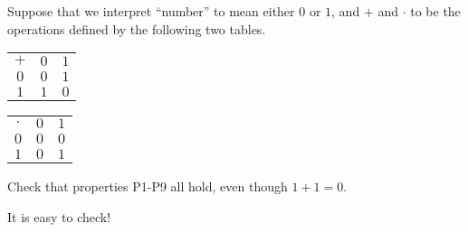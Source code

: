\begin{pr} %
  Suppose that we interpret ``number'' to mean either
  $0$ or $1$, and $+$ and $\cdot$ to be the operations
  defined by the following two tables.

  \par
  \medskip
  \begin{tabular}{c|c|c|}
    \multicolumn{1}{c}{$+$}  & \multicolumn{1}{c}{$0$} &
    \multicolumn{1}{c}{$1$} \\
    \cline{2-3}
    \multicolumn{1}{c|}{$0$}  & $0$ & $1$ \\
    \cline{2-3}
    \multicolumn{1}{c|}{$1$}  & $1$ & $0$ \\
    \cline{2-3}
  \end{tabular}
  \hspace{35pt}
  \begin{tabular}{c|c|c|}
    \multicolumn{1}{c}{$\cdot$}  & \multicolumn{1}{c}{$0$} &
    \multicolumn{1}{c}{$1$} \\
    \cline{2-3}
    \multicolumn{1}{c|}{$0$}  & $0$ & $0$ \\
    \cline{2-3}
    \multicolumn{1}{c|}{$1$}  & $0$ & $1$ \\
    \cline{2-3}
  \end{tabular}

  \par
  \medskip
  Check that properties P1-P9 all hold, even though
  $1 + 1 = 0$.
\end{pr}

\begin{solution}
  It is easy to check!
\end{solution}
